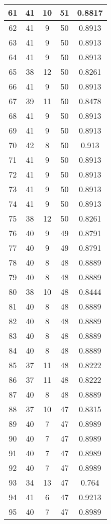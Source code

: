 \documentclass[letterpaper, 12pt]{article}
\begin{document}
\begin{longtable}{|c|c|c|c|c|}
\hline
61 & 41 & 10 & 51 & 0.8817 \\
\hline
62 & 41 & 9 & 50 & 0.8913 \\
\hline
63 & 41 & 9 & 50 & 0.8913 \\
\hline
64 & 41 & 9 & 50 & 0.8913 \\
\hline
65 & 38 & 12 & 50 & 0.8261 \\
\hline
66 & 41 & 9 & 50 & 0.8913 \\
\hline
67 & 39 & 11 & 50 & 0.8478 \\
\hline
68 & 41 & 9 & 50 & 0.8913 \\
\hline
69 & 41 & 9 & 50 & 0.8913 \\
\hline
70 & 42 & 8 & 50 & 0.913 \\
\hline
71 & 41 & 9 & 50 & 0.8913 \\
\hline
72 & 41 & 9 & 50 & 0.8913 \\
\hline
73 & 41 & 9 & 50 & 0.8913 \\
\hline
74 & 41 & 9 & 50 & 0.8913 \\
\hline
75 & 38 & 12 & 50 & 0.8261 \\
\hline
76 & 40 & 9 & 49 & 0.8791 \\
\hline
77 & 40 & 9 & 49 & 0.8791 \\
\hline
78 & 40 & 8 & 48 & 0.8889 \\
\hline
79 & 40 & 8 & 48 & 0.8889 \\
\hline
80 & 38 & 10 & 48 & 0.8444 \\
\hline
81 & 40 & 8 & 48 & 0.8889 \\
\hline
82 & 40 & 8 & 48 & 0.8889 \\
\hline
83 & 40 & 8 & 48 & 0.8889 \\
\hline
84 & 40 & 8 & 48 & 0.8889 \\
\hline
85 & 37 & 11 & 48 & 0.8222 \\
\hline
86 & 37 & 11 & 48 & 0.8222 \\
\hline
87 & 40 & 8 & 48 & 0.8889 \\
\hline
88 & 37 & 10 & 47 & 0.8315 \\
\hline
89 & 40 & 7 & 47 & 0.8989 \\
\hline
90 & 40 & 7 & 47 & 0.8989 \\
\hline
91 & 40 & 7 & 47 & 0.8989 \\
\hline
92 & 40 & 7 & 47 & 0.8989 \\
\hline
93 & 34 & 13 & 47 & 0.764 \\
\hline
94 & 41 & 6 & 47 & 0.9213 \\
\hline
95 & 40 & 7 & 47 & 0.8989 \\

\end{longtable}
\end{document}
